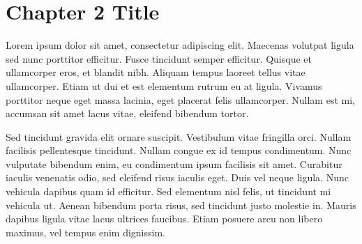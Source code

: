 \chapter{Chapter 2 Title}
Lorem ipsum dolor sit amet, consectetur adipiscing elit. Maecenas volutpat ligula sed nunc porttitor efficitur. Fusce tincidunt semper efficitur. Quisque et ullamcorper eros, et blandit nibh. Aliquam tempus laoreet tellus vitae ullamcorper. Etiam ut dui et est elementum rutrum eu at ligula. Vivamus porttitor neque eget massa lacinia, eget placerat felis ullamcorper. Nullam est mi, accumsan sit amet lacus vitae, eleifend bibendum tortor. \par
Sed tincidunt gravida elit ornare suscipit. Vestibulum vitae fringilla orci. Nullam facilisis pellentesque tincidunt. Nullam congue ex id tempus condimentum. Nunc vulputate bibendum enim, eu condimentum ipsum facilisis sit amet. Curabitur iaculis venenatis odio, sed eleifend risus iaculis eget. Duis vel neque ligula. Nunc vehicula dapibus quam id efficitur. Sed elementum nisl felis, ut tincidunt mi vehicula ut. Aenean bibendum porta risus, sed tincidunt justo molestie in. Mauris dapibus ligula vitae lacus ultrices faucibus. Etiam posuere arcu non libero maximus, vel tempus enim dignissim.\par 

